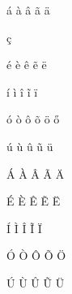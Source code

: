 \documentclass[12pt,a4paper]{article}
\begin{document}
á
à
â
ã
ä
 
ç
 
é
è
ê
ẽ
ë
 
í
ì
î
ĩ
ï
 
ó
ò
ô
õ
ö
ő
 
ú
ù
û
ũ
ü
 
Á
À
Â
Ã
Ä
 
É
È
Ê
Ẽ
Ë
 
Í
Ì
Î
Ĩ
Ï
 
Ó
Ò
Ô
Õ
Ö
 
Ú
Ù
Û
Ũ
Ü
\end{document}
